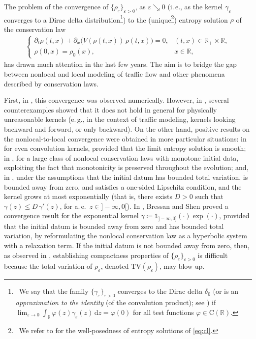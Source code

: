 \documentclass[10pt]{amsart}
\theoremstyle{plain}
\theoremstyle{definition}
\numberwithin{equation}{section}
\newcommand{\R}{\mathbb{R}}
\newcommand{\eps}{{\varepsilon}}
\newcommand{\pt}{\partial_t}
\newcommand{\px}{\partial_x }
\begin{document}
The problem of the convergence of $\{\rho_{\varepsilon}\}_{\varepsilon >0}$, as $\varepsilon \searrow 0$ (i.\,e., as the kernel $\gamma_\eps$ converges to a Dirac delta distribution\footnote{~We say that the family $\{\gamma_\varepsilon\}_{\varepsilon >0}$ converges to the Dirac delta $\delta_0$ (or is an \textit{approximation to the identity} (of the convolution product); see \cite[\S\,II.6.31]{MR1157815}) if 
$
\lim_{\varepsilon \to 0} \int_{\R} \varphi(z) \gamma_\varepsilon(z) \, \mathrm d z = \varphi(0)
$
for all test functions $\varphi \in \mathrm{C}(\mathbb R)$.
}) 
to the (unique\footnote{~We refer to \cite{MR1304494,MR3443431} for the well-posedness of entropy solutions of \cref{eq:cl}. 
}) entropy solution $\rho$ of the conservation law 
\begin{align}\label{eq:cl}
    \begin{cases}
        \pt \rho(t,x) + \px\Big(V(\rho(t,x))\,\rho(t,x)\Big) = 0, & (t,x) \in \R_+ \times \R, \\
        \rho(0,x) = \rho_0(x), & x \in\R,
    \end{cases}
\end{align}
has drawn much attention in the last few years. The aim is to bridge the gap between nonlocal and local modeling of traffic flow and other phenomena described by conservation laws.

First, in \cite{MR3342191}, this convergence was observed numerically. However, in \cite{MR3961295}, several counterexamples showed that it does not hold in general for physically unreasonable kernels (e.\,g., in the context of traffic modeling, kernels looking backward and forward, or only backward). On the other hand, positive results on the nonlocal-to-local convergence were obtained in more particular situations: in \cite{MR1704419} for even convolution kernels, provided that the limit entropy solution is smooth; in \cite{MR3944408}, for a large class of nonlocal conservation laws with monotone initial data, exploiting the fact that monotonicity is preserved throughout the evolution; and, in \cite{MR4300935}, under the assumptions that the initial datum has bounded total variation, is bounded away from zero, and satisfies a one-sided Lipschitz condition, and the kernel grows at most exponentially (that is, there exists $D>0$ such that \(\gamma(z) \le D \, \gamma'(z)\), for a.\,e.~$z \in ]-\infty, 0[$). In \cite{MR4110434,MR4283539}, Bressan and Shen proved a convergence result for the exponential kernel $\gamma \coloneqq \mathds{1}_{]-\infty,0]}(\cdot)\exp(\cdot)$, provided that the initial datum is bounded away from zero and has bounded total variation, by reformulating the nonlocal conservation law as a hyperbolic system with a relaxation term. If the initial datum is not bounded away from zero, then, as observed in \cite{MR4300935}, establishing compactness properties of $\{\rho_{\varepsilon}\}_{\varepsilon >0}$ is difficult because the total variation of $\rho_\varepsilon$, denoted  $\mathrm{TV}(\rho_\varepsilon)$, may blow up. 
\end{document}
